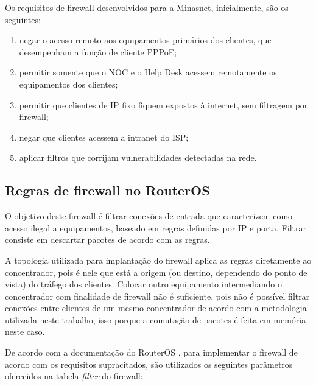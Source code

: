     Os requisitos de firewall desenvolvidos para a Minasnet, inicialmente, são os seguintes: 
    
    \begin{enumerate}[label=\alph*)]
        \item negar o acesso remoto aos equipamentos primários dos clientes, que desempenham a função de cliente PPPoE;
        \item permitir somente que o NOC e o Help Desk acessem remotamente os equipamentos dos clientes;
        \item permitir que clientes de IP fixo fiquem expostos à internet, sem filtragem por firewall;
        \item negar que clientes acessem a intranet do ISP;
        \item aplicar filtros que corrijam vulnerabilidades detectadas na rede.
    \end{enumerate}
    
\subsection{Regras de firewall no RouterOS}

    O objetivo deste firewall é filtrar conexões de entrada que caracterizem como acesso ilegal a equipamentos, baseado em regras definidas por IP e porta. Filtrar consiste em descartar pacotes de acordo com as regras.
    
    A topologia utilizada para implantação do firewall aplica as regras diretamente ao concentrador, pois é nele que está a origem (ou destino, dependendo do ponto de vista) do tráfego dos clientes. Colocar outro equipamento intermediando o concentrador com finalidade de firewall não é suficiente, pois não é possível filtrar conexões entre clientes de um mesmo concentrador de acordo com a metodologia utilizada neste trabalho, isso porque a comutação de pacotes é feita em memória neste caso.
    
    De acordo com a documentação do RouterOS \cite{fwmikrotik}, para implementar o firewall de acordo com os requisitos supracitados, são utilizados os seguintes parâmetros oferecidos na tabela \textit{filter} do firewall:
    
